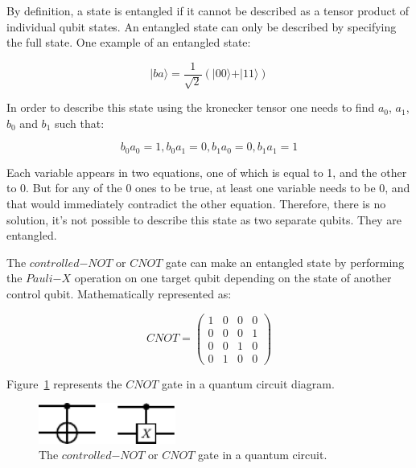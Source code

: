 By definition, a state is entangled if it cannot be described as a tensor product
of individual qubit states. An entangled state can only be described by specifying 
the full state. One example of an entangled state:

\begin{linenomath}
\begin{equation}
	\vert ba \rangle = \frac{1}{\sqrt{2}} (\vert 00 \rangle + \vert 11 \rangle)
\label{eq:entg}
\end{equation}
\end{linenomath}

In order to describe this state using the kronecker tensor one needs to find 
$a_0$, $a_1$, $b_0$ and $b_1$ such that: 

\begin{linenomath}
\begin{equation}
b_0a_0=1,
b_0a_1=0, 
b_1a_0=0,
b_1a_1=1
\label{eq:entgcond}
\end{equation}
\end{linenomath}

Each variable appears in two equations, one of which is equal to 1, and the other
to 0. But for any of the 0 ones to be true, at least one variable needs to be 0,
and that would immediately contradict the other equation. Therefore, there is no
solution, it's not possible to describe this state as two separate qubits. They 
are entangled.

The $controlled\mathrm{-}NOT$ or $CNOT$ gate can make an entangled state by performing 
the $Pauli\mathrm{-}X$ operation on one target qubit depending on the state of 
another control qubit. Mathematically represented as:

\begin{linenomath}
\begin{equation}
CNOT = \begin{pmatrix}
1 & 0 & 0 & 0 \\
0 & 0 & 0 & 1 \\
0 & 0 & 1 & 0 \\
0 & 1 & 0 & 0 
\end{pmatrix}
\label{eq:cnot}
\end{equation}
\end{linenomath}

Figure~\ref{fig:cnot} represents the $CNOT$ gate in a quantum circuit diagram.

\begin{figure}[!htbp]
\centering
	\includegraphics[width=0.40\textwidth]{figures/CNOT.pdf}
\caption{The $controlled\mathrm{-}NOT$ or $CNOT$ gate in a quantum circuit.}
\label{fig:cnot}
\end{figure}

